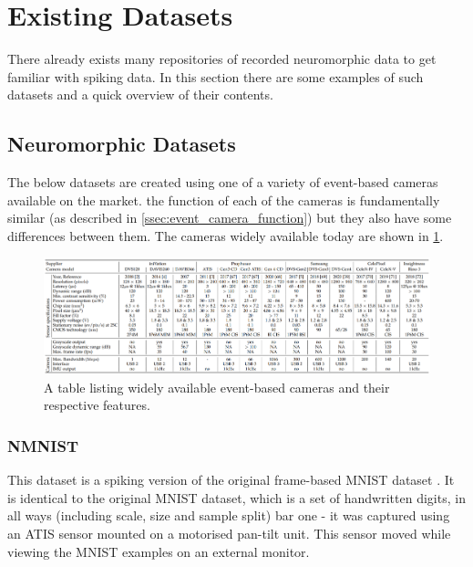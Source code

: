 \section{Existing Datasets} \label{sec:existing_datasets}

There already exists many repositories of recorded neuromorphic data to get familiar with spiking data. In this section there are some examples of such datasets and a quick overview of their contents.

\subsection{Neuromorphic Datasets} \label{ssec:neuromorphic_datasets}

The below datasets are created using one of a variety of event-based cameras available on the market. the function of each of the cameras is fundamentally similar (as described in \cref{ssec:event_camera_function}) but they also have some differences between them. The cameras widely available today are shown in \cref{fig:camera_models}.

\begin{figure}[htb]
      \centering
      \includegraphics[width=\textwidth]{background/images/camera_models.png}
      \caption{A table listing widely available event-based cameras and their respective features\cite{EventBasedVisionASurvery}.}
      \label{fig:camera_models}
\end{figure}

\subsubsection{NMNIST} \label{sssec:nmnist}

This dataset is a spiking version of the original frame-based MNIST dataset \cite{MNIST}\cite{NMNIST}. It is identical to the original MNIST dataset, which is a set of handwritten digits, in all ways (including scale, size and sample split) bar one - it was captured using an ATIS sensor mounted on a motorised pan-tilt unit. This sensor moved while viewing the MNIST examples on an external monitor.

